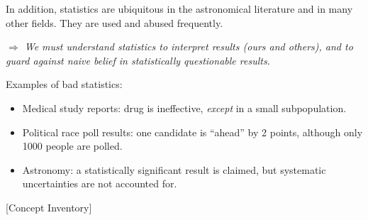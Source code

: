 \documentclass[12pt]{report}
\begin{document}
In addition, statistics are ubiquitous in the astronomical literature and in
many other fields. They are used and abused frequently.

\emph{$\Rightarrow$ We must understand statistics to interpret results (ours
  and others), and to guard against naive belief in statistically questionable
  results. }

Examples of bad statistics:
\begin{itemize}
\item Medical study reports: drug is ineffective, \emph{except} in a small
  subpopulation.
  
\item Political race poll results: one candidate is ``ahead'' by 2 points,
  although only 1000 people are polled.
  
\item Astronomy: a statistically significant result is claimed, but
  systematic uncertainties are not accounted for.
\end{itemize}

[Concept Inventory]



\end{document}
